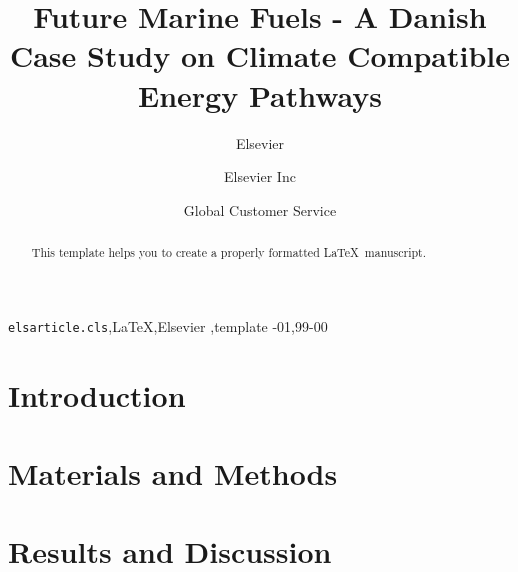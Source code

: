 \documentclass[article]{elsarticle}
\begin{document}
\begin{frontmatter}

\title{Future Marine Fuels - A Danish Case Study on Climate Compatible Energy Pathways}

\author{Elsevier}
\address{Radarweg 29, Amsterdam}

\author[mymainaddress,mysecondaryaddress]{Elsevier Inc}

\author[mysecondaryaddress]{Global Customer Service}

\address[mymainaddress]{1600 John F Kennedy Boulevard, Philadelphia}
\address[mysecondaryaddress]{360 Park Avenue South, New York}

\begin{abstract}
This template helps you to create a properly formatted \LaTeX\ manuscript.
\end{abstract}

\begin{keyword}
\texttt{elsarticle.cls}\sep \LaTeX\sep Elsevier \sep template
-01\sep  99-00
\end{keyword}

\end{frontmatter}

\linenumbers

\section{Introduction}

\section{Materials and Methods}

\section{Results and Discussion}
\end{document}

